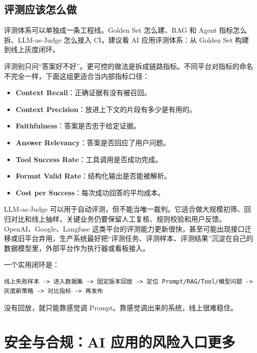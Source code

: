 \documentclass[10pt,a4paper]{ctexart}
\begin{document}
\subsection{评测应该怎么做}


评测体系可以单独成一条工程线。Golden Set 怎么建、RAG 和 Agent 指标怎么拆、LLM-as-Judge 怎么接入 CI，建议看 AI 应用评测体系：从 Golden Set 构建到线上灰度闭环。



评测别只问“答案好不好”。更可控的做法是拆成链路指标。不同平台对指标的命名不完全一样，下面这组更适合当内部指标口径：


\begin{itemize}[itemsep=2pt, topsep=4pt]
  \item \textbf{Context Recall}：正确证据有没有被召回。
  \item \textbf{Context Precision}：放进上下文的片段有多少是有用的。
  \item \textbf{Faithfulness}：答案是否忠于给定证据。
  \item \textbf{Answer Relevancy}：答案是否回应了用户问题。
  \item \textbf{Tool Success Rate}：工具调用是否成功完成。
  \item \textbf{Format Valid Rate}：结构化输出是否能被解析。
  \item \textbf{Cost per Success}：每次成功回答的平均成本。
\end{itemize}


LLM-as-Judge 可以用于自动评测，但不能当唯一裁判。它适合做大规模初筛、回归对比和线上抽样，关键业务仍要保留人工复核、规则校验和用户反馈。OpenAI、Google、Langfuse 这类平台的评测能力更新很快，甚至可能出现接口迁移或旧平台弃用，生产系统最好把“评测任务、评测样本、评测结果”沉淀在自己的数据模型里，外部平台作为执行器或看板接入。



一个实用闭环是：



\begin{lstlisting}
线上失败样本 -> 进入数据集 -> 固定版本回放 -> 定位 Prompt/RAG/Tool/模型问题 -> 灰度新策略 -> 对比指标 -> 再发布
\end{lstlisting}



没有回放，就只能靠感觉调 Prompt。靠感觉调出来的系统，线上很难稳住。



\section{安全与合规：AI 应用的风险入口更多}
\end{document}

